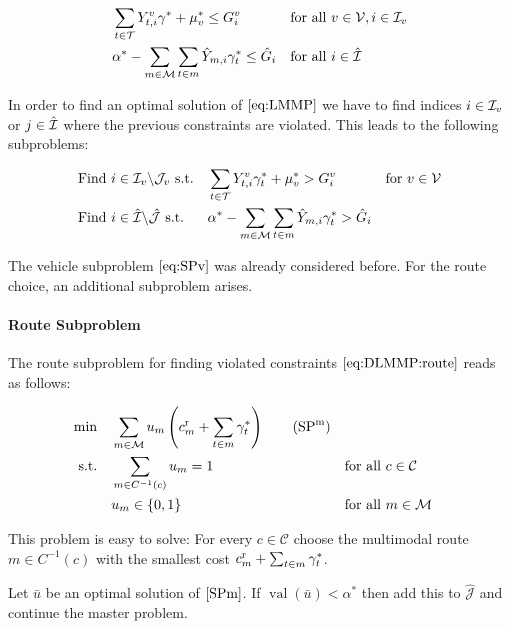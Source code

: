 \begin{align}
	& \sum_{t\in\mathcal{T}} Y^v_{t,i}\gamma^* + \mu^*_v \leq G^v_i && \text{for all } v\in\mathcal{V},i\in\mathcal{I}_v \label{eq:DLMMP:vehicle} \\
	& \alpha^* - \sum_{m\in\mathcal{M}}\sum_{t\in m}\hat{Y}_{m,i}\gamma^*_t \leq \hat{G}_i && \text{for all } i\in\hat{\mathcal{I}} \label{eq:DLMMP:route}
\end{align}

In order to find an optimal solution of $\eqref{eq:LMMP}$ we have to find indices $i\in\mathcal{I}_v$ or $j\in\hat{\mathcal{I}}$ where the previous constraints are violated. This leads to the following subproblems:

\begin{align*}
	& \text{Find } i\in\mathcal{I}_v\backslash\mathcal{J}_v \text{ s.t.} && \sum_{t\in\mathcal{T}}Y^v_{t,i}\gamma^*_t + \mu^*_v > G^v_i && \text{for } v\in\mathcal{V} \\
	& \text{Find } i\in\hat{\mathcal{I}}\backslash\hat{\mathcal{J}} \text{ s.t.} && \alpha^*-\sum_{m\in\mathcal{M}}\sum_{t\in m}\hat{Y}_{m,i}\gamma^*_t > \hat{G}_i
\end{align*}

The vehicle subproblem $\eqref{eq:SPv}$ was already considered before. For the route choice, an additional subproblem arises.

\paragraph{Route Subproblem} \parfill

The route subproblem for finding violated constraints $\eqref{eq:DLMMP:route}$ reads as follows:

\begin{align*}
	\min \quad & \sum_{m\in\mathcal{M}}u_m\left(\croute_m + \sum_{t\in m}\gamma^*_t\right) \tag{$\SPm$} \label{SPm} \\
	\text{s.t.} \quad & \sum_{m\in C^{-1}(c)}u_m = 1 && \text{for all } c\in\mathcal{C} \\
	& u_m\in\{0,1\} && \text{for all } m\in\mathcal{M}
\end{align*}

This problem is easy to solve: For every $c\in\mathcal{C}$ choose the multimodal route $m\in C^{-1}(c)$ with the smallest cost $c^{\operatorname{r}}_m + \sum_{t\in m}\gamma^*_t$. 

Let $\bar{u}$ be an optimal solution of $\eqref{SPm}$. If $\operatorname{val}\left(\bar{u}\right)<\alpha^*$ then add this to $\hat{\mathcal{J}}$ and continue the master problem.